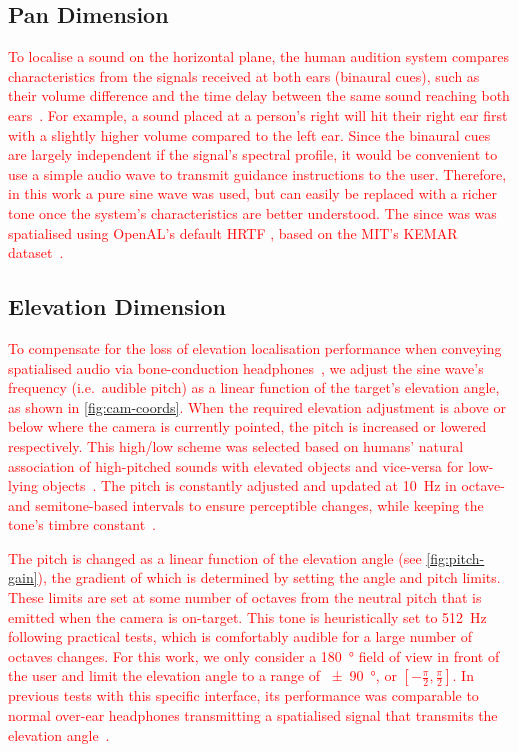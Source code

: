 \documentclass[acmsmall]{acmart}
\newcommand\hl[1]{\textcolor{red}{#1}}
\begin{document}
\subsection{Pan Dimension}

\hl{To localise a sound on the horizontal plane, the human audition system compares characteristics from the signals received at both ears (binaural cues), such as their volume difference and the time delay between the same sound reaching both ears~\citep{blauert1969sound}.
For example, a sound placed at a person's right will hit their right ear first with a slightly higher volume compared to the left ear.
Since the binaural cues are largely independent if the signal's spectral profile, it would be convenient to use a simple audio wave to transmit guidance instructions to the user.
Therefore, in this work a pure sine wave was used, but can easily be replaced with a richer tone once the system's characteristics are better understood. 
The since was was spatialised using OpenAL's default HRTF , based on the MIT's KEMAR dataset~\citep{hiebert2005openal}.} %

\subsection{Elevation Dimension}

\hl{To compensate for the loss of elevation localisation performance when conveying spatialised audio via bone-conduction headphones~\citep{macdonald2006spatial,schonstein2008comparison}, we adjust the sine wave's frequency (i.e.\ audible pitch) as a linear function of the target's elevation angle, as shown in \cref{fig:cam-coords}.
When the required elevation adjustment is above or below where the camera is currently pointed, the pitch is increased or lowered respectively. 
This high/low scheme was selected based on humans' natural association of high-pitched sounds with elevated objects and vice-versa for low-lying objects~\citep{pratt1930spatial,blauert1997spatial}.
The pitch is constantly adjusted and updated at \SI{10}{\hertz} in octave- and semitone-based intervals to ensure perceptible changes, while keeping the tone's timbre constant~\citep{shepard1964circularity}. }

\hl{The pitch is changed as a linear function of the elevation angle (see \cref{fig:pitch-gain}), the gradient of which is determined by setting the angle and pitch limits.
These limits are set at some number of octaves from the neutral pitch that is emitted when the camera is on-target. 
This tone is heuristically set to \SI{512}{\hertz} following practical tests, which is comfortably audible for a large number of octaves changes.
For this work, we only consider a \SI{180}{\degree} field of view in front of the user and limit the elevation angle to a range of \SI{\pm90}{\degree}, or $[-\frac{\pi}{2}, \frac{\pi}{2}]$.
In previous tests with this specific interface, its performance was comparable to normal over-ear headphones transmitting a spatialised signal that transmits the elevation angle~\citep{lock2019bone}.}
\end{document}
